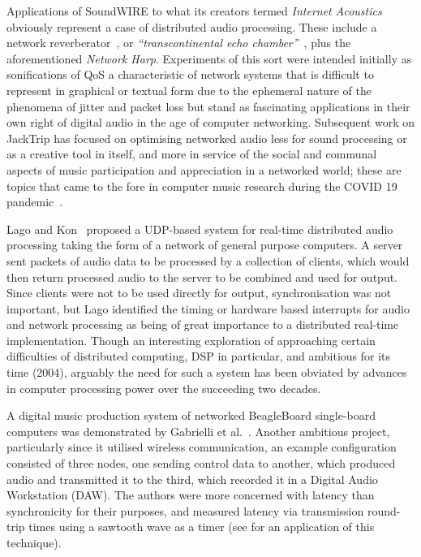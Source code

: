 Applications of SoundWIRE to what its creators termed \textit{Internet
Acoustics}~\citep{chafe_physical_2002} obviously represent a case of distributed
audio processing.
These include a network reverberator~\citep{chafe_i_2018}, or
\textit{``transcontinental echo chamber''}~\citep{chafe_simplified_2000},
plus the aforementioned \textit{Network Harp}.
Experiments of this sort were intended initially as sonifications of QoS
\textemdash{} a characteristic of network systems that is difficult to represent
in graphical or textual form due to the ephemeral nature of the phenomena of
jitter and packet loss \textemdash{} but stand as fascinating applications in
their own right of digital audio in the age of computer networking.
Subsequent work on JackTrip has focused on optimising networked audio less
for sound processing or as a creative tool in itself, and more in service of
the social and communal aspects of music participation and appreciation in a
networked world;
these are topics that came to the fore in computer music research during the
COVID 19 pandemic~\citep{bosi_experiencing_2021,sacchetto_jacktrip-webrtc_2021}.

Lago and Kon~\citep{lago_middleware_2003} proposed a UDP-based system for
real-time distributed audio processing taking the form of a network of general
purpose computers.
A server sent packets of audio data to be processed by a collection of
clients, which would then return processed audio to the server to be combined
and used for output.
Since clients were not to be used directly for output, synchronisation was not
important, but Lago identified the timing or hardware based interrupts for
audio and network processing as being of great importance to a distributed
real-time implementation.
Though an interesting exploration of approaching certain difficulties of
distributed computing, DSP in particular, and ambitious for its time (2004),
arguably the need for such a system has been obviated by advances in computer
processing power over the succeeding two decades.

A digital music production system of networked BeagleBoard single-board
computers was demonstrated by Gabrielli et al.~\citep{gabrielli_networked_2012}.
Another ambitious project, particularly since it utilised wireless
communication, an example configuration consisted of three nodes, one sending
control data to another, which produced audio and transmitted it to the third,
which recorded it in a Digital Audio Workstation (DAW).
The authors were more concerned with latency than synchronicity for their
purposes, and measured latency via transmission round-trip times using a
sawtooth wave as a timer (see  for an
application of this technique).

